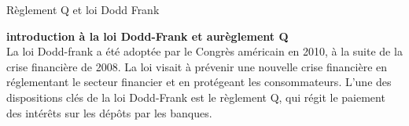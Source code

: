 \begin{frame}{Règlement Q et loi Dodd Frank }
    
\textbf{introduction à la loi Dodd-Frank et aurèglement Q}
\\


La loi Dodd-frank a été adoptée par le Congrès américain en 2010, à la suite de la crise financière de 2008. La loi visait à prévenir une nouvelle crise financière en réglementant le secteur financier et en protégeant les consommateurs. L'une des dispositions clés de la loi Dodd-Frank est le règlement Q, qui régit le paiement des intérêts sur les dépôts par les banques.
   
\end{frame}